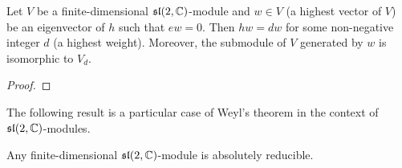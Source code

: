 \begin{corollary}
    Let $V$ be a finite-dimensional $\mathfrak{sl}(2,\mathbb{C})$-module and $w\in V$ 
    (a highest vector of $V$)
    be an eigenvector of $h$ 
    such that $ew=0$. Then $hw=dw$ for some
    non-negative integer $d$ (a highest weight). 
    Moreover, the submodule
    of $V$ generated by $w$ is isomorphic to $V_d$. 
\end{corollary}

\begin{proof}
    
\end{proof}

The following result is a particular
case of Weyl's theorem in the context of $\mathfrak{sl}(2,\mathbb{C})$-modules. 

\begin{theorem}
    Any finite-dimensional $\mathfrak{sl}(2,\mathbb{C})$-module is absolutely reducible. 
\end{theorem}

